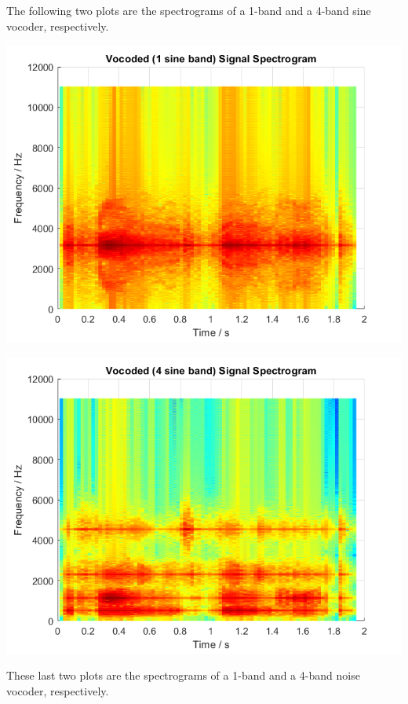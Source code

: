 \documentclass[11pt]{article}
\begin{document}
The following two plots are the spectrograms of a 1-band and a 4-band sine vocoder, respectively.

\includegraphics[width=\textwidth]{output/vocoded_1sine_spectrogram.png}

\includegraphics[width=\textwidth]{output/vocoded_4sine_spectrogram.png}

These last two plots are the spectrograms of a 1-band and a 4-band noise vocoder, respectively.
\end{document}
